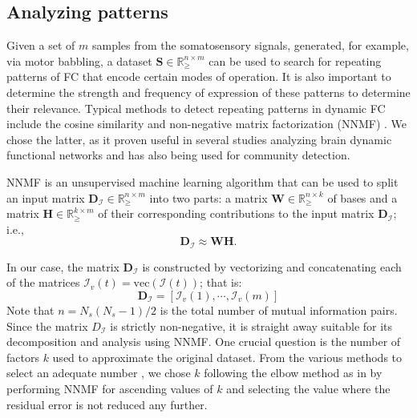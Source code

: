 \subsection{Analyzing patterns}
Given a set of $m$ samples from the somatosensory signals, generated, for example, via motor babbling, a dataset $\bm{S} \in \mathbb{R}^{n \times m}_{\geq}$ can be used to search for repeating patterns of FC that encode certain modes of operation. It is also important to determine the strength and frequency of expression of these patterns to determine their relevance. Typical methods to detect repeating patterns in dynamic FC include the cosine similarity \cite{Menon2019comparisonstaticdynamic} and  non-negative matrix factorization (NNMF) \cite{Fu2019Nonnegativematrixfactorization}. We chose the latter, as it proven useful in several studies analyzing brain dynamic functional networks and has also being used for community  detection\cite{Wang2011Communitydiscoveryusing,Luo2021Symmetricnonnegativematrix}.

NNMF is an unsupervised machine learning algorithm that can be used to split an input matrix $\bm{D}_{\bm{\mathcal{I}}} \in \mathbb{R}^{n\times m}_{\geq}$ into two parts: a matrix $\bm{W} \in \mathbb{R}^{n\times k}_{\geq}$ of bases and a matrix $\bm{H} \in \mathbb{R}^{k\times m}_{\geq}$ of their corresponding contributions to the input matrix $\bm{D}_{\bm{\mathcal{I}}}$; i.e.,
\begin{equation}
	\bm{D}_{\bm{\mathcal{I}}} 	\approx \bm{W} \bm{H}.
\end{equation}

In our case, the matrix $\bm{D}_{\bm{\mathcal{I}}}$ is constructed by vectorizing  and concatenating each of the matrices $\bm{\mathcal{I}}_v(t) = \text{vec}\left(\bm{\mathcal{I}}(t)\right)$; that is: 
\begin{equation}
	\bm{D}_{\bm{\mathcal{I}}} = [\bm{\mathcal{I}}_v(1),\cdots,\bm{\mathcal{I}}_v(m)]
\end{equation}
Note that $n = N_s(N_s-1)/2$ is the total number of mutual information pairs. Since the matrix $D_{\bm{\mathcal{I}}}$ is strictly non-negative, it is straight away suitable for its decomposition and analysis using NNMF. One crucial question is the number of factors $k$ used to approximate the original dataset. From the various methods to select an adequate number \cite{Muzzarelli2019RankSelectionNon}, we chose $k$ following the elbow method as in \cite{Phalen2020Nonnegativematrix} by performing NNMF for ascending values of $k$ and selecting the value where the residual error is not reduced any further.

